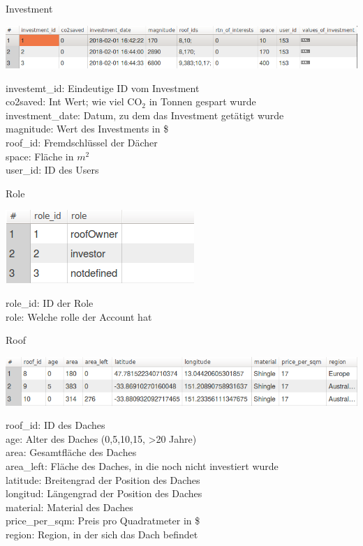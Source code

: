 \documentclass[12pt,a4paper]{article}
\begin{document}
\textbullet Investment

\includegraphics[scale=0.5]{./Graphics/investment}
\bigskip

\noindent \textbullet investemt\_id: Eindeutige ID vom Investment\\
\textbullet co2saved: Int Wert; wie viel CO$_2$ in Tonnen gespart wurde\\
\textbullet investment\_date: Datum, zu dem das Investment getätigt wurde\\
\textbullet magnitude: Wert des Investments in \$ \\
\textbullet roof\_id: Fremdschlüssel der Dächer \\
\textbullet space: Fläche in $m^2$\\
\textbullet user\_id: ID des Users\\
\bigskip

\textbullet Role

\includegraphics[scale=0.5]{./Graphics/role}

\noindent \textbullet role\_id: ID der Role\\
\textbullet role: Welche rolle der Account hat
\bigskip

\textbullet Roof

\includegraphics[scale=0.5]{./Graphics/roof1}

\noindent \textbullet roof\_id: ID des Daches\\
\textbullet age: Alter des Daches (0,5,10,15, >20 Jahre)\\
\textbullet area: Gesamtfläche des Daches\\
\textbullet area\_left: Fläche des Daches, in die noch nicht investiert wurde\\
\textbullet latitude: Breitengrad der Position des Daches\\
\textbullet longitud: Längengrad der Position des Daches\\
\textbullet material: Material des Daches\\
\textbullet price\_per\_sqm: Preis pro Quadratmeter in \$ \\
\textbullet region: Region, in der sich das Dach befindet\\
\bigskip
\end{document}
